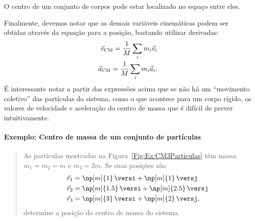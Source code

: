 \begin{marginfigure}
\centering
{}
\caption{O centro de um conjunto de corpos pode estar localizado no espaço entre eles.}
\end{marginfigure}

Finalmente, devemos notar que as demais variáveis cinemáticas podem ser obtidas através da equação para a posição, bastando utilizar derivadas:
\begin{align}
    \vec{v}_{\rm{CM}} = \frac{1}{M} \sum_{i} m_i \vec{v}_i \label{Eq:VelCMPart}\\
    \vec{a}_{\rm{CM}} = \frac{1}{M} \sum_{i} m_i \vec{a}_i. \label{Eq:AcelCMPart}
\end{align}
%
É interessante notar a partir das expressões acima que se não há um ``movimento coletivo'' das partículas do sistema, como o que acontece para um corpo rígido, os valores de velocidade e aceleração do centro de massa que é difícil de prever intuitivamente.

\paragraph{Exemplo: Centro de massa de um conjunto de partículas}

\begin{quote}
    As partículas mostradas na Figura~\ref{Fig:Ex:CM3Particulas} têm massa $m_1 = m_2 = m$ e $m_3 = 2m$. Se suas posições são
        \begin{align}
            \vec{r}_1 &= \np[m]{1} \, \versi + \np[m]{1} \, \versj \\
            \vec{r}_2 &= \np[m]{1.5} \, \versi + \np[m]{2.5} \, \versj \\
            \vec{r}_3 &= \np[m]{3} \, \versi + \np[m]{2} \, \versj,
        \end{align}
determine a posição do centro de massa do sistema.
\end{quote}

